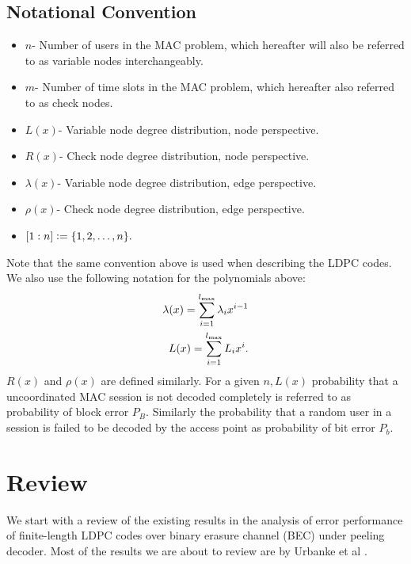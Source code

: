\subsection{Notational Convention}
\begin{itemize}
\item $n$- Number of users in the MAC problem, which hereafter will also be referred to as variable nodes interchangeably.
\item $m$- Number of time slots in the MAC problem, which hereafter also referred to as check nodes.
\item $L(x)$- Variable node degree distribution, node perspective.
\item $R(x)$- Check node degree distribution, node perspective.
\item $\lambda(x)$- Variable node degree distribution, edge perspective.
\item $\rho(x)$- Check node degree distribution, edge perspective.
\item $[1:n]\mathrel{\mathop:}=\{1,2,\ldots, n\}.$
\end{itemize}
Note that the same convention above is used when describing the LDPC codes. We also use the following notation for the polynomials above:
\begin{align*}
\lambda(x)=\sum_{i=1}^{l_{\text{max}}} \lambda_{i}x^{i-1}\\
L(x)=\sum_{i=1}^{l_{\text{max}}} L_{i}x^{i}.
\end{align*}
$R(x)$ and $\rho(x)$ are defined similarly. For a given $n, L(x)$ probability that a uncoordinated MAC session is not decoded completely is referred to as probability of block error $P_{B}$. Similarly the probability that a random user in a session is failed to be decoded by the access point as probability of bit error $P_{b}$.
\section{Review}
We start with a review of the existing results in the analysis of error performance of finite-length LDPC codes over binary erasure channel (BEC) under peeling decoder. Most of the results we are about to review are by Urbanke et al \cite{amraoui2007find}.

